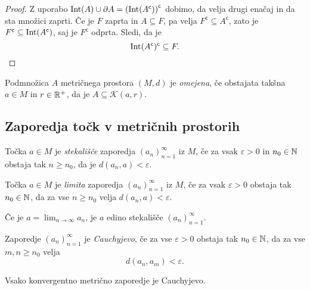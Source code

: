 \documentclass[12pt, a4paper]{article}
\begin{document}
\begin{proof}
Z uporabo $\operatorname{Int}(A)\cup\partial A=\left(\operatorname{Int}(A^\mathsf{c})\right)^\mathsf{c}$ dobimo, da velja drugi enačaj in da sta množici zaprti. Če je $F$ zaprta in $A\subseteq F$, pa velja $F^\mathsf{c}\subseteq A^\mathsf{c}$, zato je $F^\mathsf{c}\subseteq\operatorname{Int}(A^\mathsf{c})$, saj je $F^\mathsf{c}$ odprta. Sledi, da je
\[
\operatorname{Int}(A^\mathsf{c})^\mathsf{c}\subseteq F.\qedhere
\]
\end{proof}

\begin{definicija}
Podmnožica $A$ metričnega prostora $(M,d)$ je \emph{omejena}, če obstajata takšna $a\in M$ in $r\in\mathbb{R}^+$, da je $A\subseteq\mathcal{K}(a,r)$.
\end{definicija}

\newpage

\subsection{Zaporedja točk v metričnih prostorih}

\begin{definicija}
Točka $a\in M$ je \emph{stekališče} zaporedja $(a_n)_{n=1}^\infty$ iz $M$, če za vsak $\varepsilon>0$ in $n_0\in\mathbb{N}$ obstaja tak $n\geq n_0$, da je $d(a_n,a)<\varepsilon$.
\end{definicija}

\begin{definicija}
Točka $a\in M$ je \emph{limita} zaporedja $(a_n)_{n=1}^\infty$ iz $M$, če za vsak $\varepsilon>0$ obstaja tak $n_0\in\mathbb{N}$, da za vse $n\geq n_0$ velja $d(a_n,a)<\varepsilon$.
\end{definicija}

\begin{trditev}
Če je $a=\displaystyle\lim_{n\to\infty}a_n$, je $a$ edino stekališče $(a_n)_{n=1}^\infty$.
\end{trditev}

\obvs

\begin{definicija}
Zaporedje $(a_n)_{n=1}^\infty$ je \emph{Cauchyjevo}, če za vse $\varepsilon>0$ obstaja tak $n_0\in\mathbb{N}$, da za vse $m,n\geq n_0$ velja
\[
d(a_n,a_m)<\varepsilon.
\]
\end{definicija}

\begin{trditev}
Vsako konvergentno metrično zaporedje je Cauchyjevo.
\end{trditev}
\end{document}
